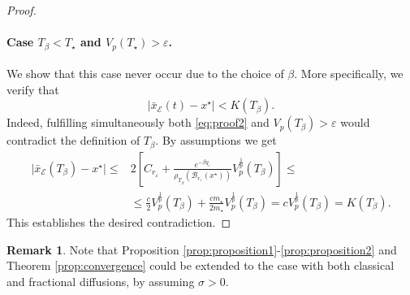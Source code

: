 \documentclass[11pt,handout]{article}%
\numberwithin{equation}{section}
\theoremstyle{definition}
\newtheorem{remark}{Remark}
\begin{document}
\begin{proof}
	\paragraph{Case $T_\beta <T_\star$ and $V_p(T_\star) > \varepsilon$.} We show that this case never occur due to the choice of $\beta$. More specifically, we verify that 
	\begin{equation}\label{eq:proof2} 
		\vert \bar{x}_\mathcal{E}(t)-x^\star \vert <K(T_\beta). 
	\end{equation}
	Indeed, fulfilling simultaneously both \eqref{eq:proof2} and $V_p(T_\beta )>\varepsilon$ would contradict the definition of $T_\beta$. By assumptions we get   
	\begin{equation*}
		\begin{split}
			\vert \bar{x}_\mathcal{E}(T_\beta)-x^\star \vert \leq & 2 \left[ C_{r_\varepsilon} +   \frac{e^{-\beta q_\varepsilon}}{\rho_{T_\beta}(\mathcal{B}_{r_\varepsilon}(x^\star))} V_p^{\frac{1}{p}}(T_\beta) \right]\leq\\ & \leq   \frac{c}{2}  V_p^{\frac{1}{p}}(T_\beta) + \frac{c m_\star}{2 m_\star} V_p^{\frac{1}{p}}(T_\beta)= c  V_p^{\frac{1}{p}}(T_\beta) = K(T_\beta). 
		\end{split}
	\end{equation*}
	This establishes the desired contradiction.
\end{proof}

\begin{remark}
	Note that Proposition \ref{prop:proposition1}-\ref{prop:proposition2} and Theorem \ref{prop:convergence} could be extended to the case with both classical and fractional diffusions, by assuming $\sigma>0$. 
\end{remark}
\end{document}
